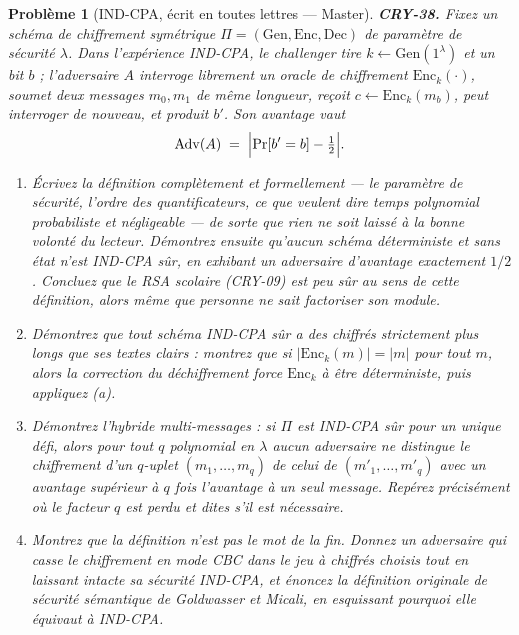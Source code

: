 \documentclass[11pt]{article}
\newtheorem{problem}{Problème}
\begin{document}
\begin{problem}[{IND-CPA, écrit en toutes lettres --- Master}]
\textbf{CRY-38.} Fixez un schéma de chiffrement symétrique
$\Pi = (\mathrm{Gen}, \mathrm{Enc}, \mathrm{Dec})$ de paramètre de sécurité
$\lambda$. Dans l'expérience IND-CPA, le challenger tire
$k \leftarrow \mathrm{Gen}(1^{\lambda})$ et un bit $b$ ; l'adversaire $A$ interroge
librement un oracle de chiffrement $\mathrm{Enc}_k(\cdot)$, soumet deux messages
$m_0, m_1$ de même longueur, reçoit $c \leftarrow \mathrm{Enc}_k(m_b)$, peut interroger de
nouveau, et produit $b'$. Son avantage vaut
\[ \mathrm{Adv}(A) \;=\; \Bigl| \Pr[b' = b] - \tfrac{1}{2} \Bigr| . \]
\begin{enumerate}
\item[(a)] Écrivez la définition complètement et formellement --- le paramètre de sécurité, l'ordre
des quantificateurs, ce que veulent dire \og{} temps polynomial probabiliste \fg{} et
\og{} négligeable \fg{} --- de sorte que rien ne soit laissé à la bonne volonté du lecteur. Démontrez
ensuite qu'\textit{aucun} schéma déterministe et sans état n'est IND-CPA sûr, en exhibant un
adversaire d'avantage exactement $1/2$. Concluez que le RSA scolaire (CRY-09) est peu sûr
au sens de cette définition, alors même que personne ne sait factoriser son module.
\item[(b)] Démontrez que tout schéma IND-CPA sûr a des chiffrés strictement plus longs que ses
textes clairs : montrez que si $|\mathrm{Enc}_k(m)| = |m|$ pour tout $m$, alors la
correction du déchiffrement force $\mathrm{Enc}_k$ à être déterministe, puis appliquez
(a).
\item[(c)] Démontrez l'hybride multi-messages : si $\Pi$ est IND-CPA sûr pour un unique défi,
alors pour tout $q$ polynomial en $\lambda$ aucun adversaire ne distingue le chiffrement
d'un $q$-uplet $(m_1,\dots,m_q)$ de celui de $(m'_1,\dots,m'_q)$ avec un avantage
supérieur à $q$ fois l'avantage à un seul message. Repérez précisément où le facteur
$q$ est perdu et dites s'il est nécessaire.
\item[(d)] Montrez que la définition n'est pas le mot de la fin. Donnez un adversaire qui casse le
chiffrement en mode CBC dans le jeu à \textit{chiffrés} choisis tout en laissant intacte sa
sécurité IND-CPA, et énoncez la définition originale de sécurité sémantique de Goldwasser et
Micali, en esquissant pourquoi elle équivaut à IND-CPA.
\end{enumerate}

\end{problem}
\end{document}
